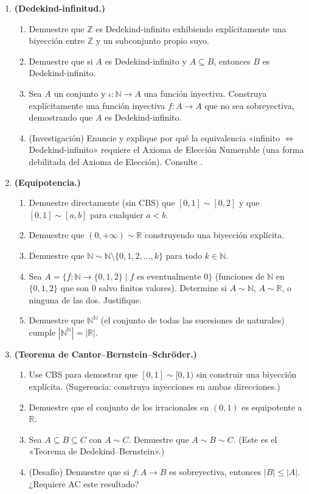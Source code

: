 \begin{enumerate}[leftmargin=2.5em, label=\textbf{\arabic*.}]
  \item \textbf{(Dedekind-infinitud.)}
  \begin{enumerate}[label=(\alph*)]
    \item Demuestre que $\mathbb{Z}$ es Dedekind-infinito exhibiendo explícitamente una biyección entre $\mathbb{Z}$ y un subconjunto propio suyo.
    \item Demuestre que si $A$ es Dedekind-infinito y $A \subseteq B$, entonces $B$ es Dedekind-infinito.
    \item Sea $A$ un conjunto y $\iota: \mathbb{N} \to A$ una función inyectiva. Construya explícitamente una función inyectiva $f: A \to A$ que no sea sobreyectiva, demostrando que $A$ es Dedekind-infinito.
    \item (Investigación) Enuncie y explique por qué la equivalencia «infinito $\Leftrightarrow$ Dedekind-infinito» requiere el Axioma de Elección Numerable (una forma debilitada del Axioma de Elección). Consulte \cite{herrlich2006}.
  \end{enumerate}

  \item \textbf{(Equipotencia.)}
  \begin{enumerate}[label=(\alph*)]
    \item Demuestre directamente (sin CBS) que $[0,1] \sim [0,2]$ y que $[0,1] \sim [a,b]$ para cualquier $a < b$.
    \item Demuestre que $(0, +\infty) \sim \mathbb{R}$ construyendo una biyección explícita.
    \item Demuestre que $\mathbb{N} \sim \mathbb{N} \setminus \{0, 1, 2, \ldots, k\}$ para todo $k \in \mathbb{N}$.
    \item Sea $A = \{f: \mathbb{N} \to \{0,1,2\} \mid f \text{ es eventualmente } 0\}$ (funciones de $\mathbb{N}$ en $\{0,1,2\}$ que son $0$ salvo finitos valores). Determine si $A \sim \mathbb{N}$, $A \sim \mathbb{R}$, o ninguna de las dos. Justifique.
    \item Demuestre que $\mathbb{N}^{\mathbb{N}}$ (el conjunto de todas las sucesiones de naturales) cumple $|\mathbb{N}^{\mathbb{N}}| = |\mathbb{R}|$.
  \end{enumerate}

  \item \textbf{(Teorema de Cantor–Bernstein–Schröder.)}
  \begin{enumerate}[label=(\alph*)]
    \item Use CBS para demostrar que $[0,1] \sim [0,1)$ sin construir una biyección explícita. (Sugerencia: construya inyecciones en ambas direcciones.)
    \item Demuestre que el conjunto de los irracionales en $(0,1)$ es equipotente a $\mathbb{R}$.
    \item Sea $A \subseteq B \subseteq C$ con $A \sim C$. Demuestre que $A \sim B \sim C$. (Este es el «Teorema de Dedekind–Bernstein».)
    \item (Desafío) Demuestre que si $f: A \to B$ es sobreyectiva, entonces $|B| \leq |A|$. ¿Requiere AC este resultado?
  \end{enumerate}


\end{enumerate}

